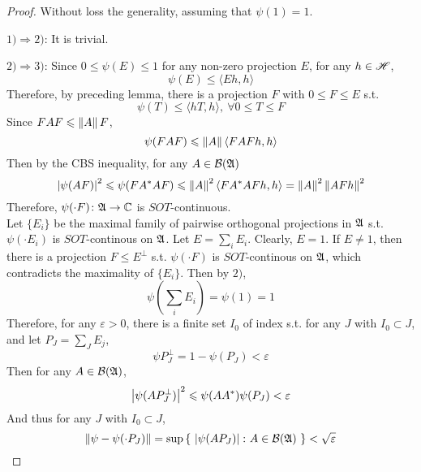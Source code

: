 \documentclass[a4paper,11pt]{report}
\begin{document}
\begin{proof}
	Without loss the generality, assuming that $\psi(1) = 1$.
	\item $1) \Rightarrow 2)$: It is trivial.
	\item $2) \Rightarrow 3)$: Since $0 \leqslant \psi(E) \leqslant 1$ for any non-zero projection $E$, for any $h \in \mathscr{H}$,
	\begin{equation*}
		\psi(E) \leqslant \langle Eh,h \rangle
	\end{equation*}
	Therefore, by preceding lemma, there is a projection $F$ with $0 \leqslant F \leqslant E$ s.t.
	\begin{equation*}
		\psi(T) \leqslant \langle hT,h \rangle,~ \forall 0 \leqslant  T \leqslant F
	\end{equation*}
	Since $FAF \leqslant \left\lVert A\right\lVert F$, 
	\begin{equation*}
		\psi(FAF) \leqslant \left\lVert A\right\lVert \langle FAFh,h \rangle
	\end{equation*}
	Then by the CBS inequality, for any $A \in \mathcal{B}(\mathfrak{A})$
	\begin{equation*}
		\left\lvert\psi(AF)\right\lvert^2 \leqslant \psi(FA^{*}AF) \leqslant \left\lVert A\right\lVert^2 \langle FA^{*}AFh,h \rangle = \left\lVert A\right\lVert^2 \left\lVert AFh\right\lVert^2
	\end{equation*}
	Therefore, $\psi(\cdot F) \colon \mathfrak{A} \rightarrow \mathbb{C}$ is $SOT$-continuous. \\
	Let $\{E_i\}$ be the maximal family of pairwise orthogonal projections in $\mathfrak{A}$ s.t. $\psi(\cdot E_i)$ is $SOT$-continous on $\mathfrak{A}$. Let $E = \sum_i E_i$. Clearly, $E = 1$. If $E \neq 1$, then there is a projection $F \leqslant E^{\bot}$ s.t. $\psi(\cdot F)$ is $SOT$-continous on $\mathfrak{A}$, which contradicts the maximality of $\{E_i\}$. Then by $2)$,
	\begin{equation*}
		\psi(\sum_i E_i) = \psi(1) = 1
	\end{equation*}  
	Therefore, for any $\varepsilon > 0$, there is a finite set $I_0$ of index s.t. for any $J$ with $I_0 \subset J$, and let $P_J = \sum_J E_j$,
	\begin{equation*}
		\psi{P_J^{\bot}} = 1- \psi(P_J) < \varepsilon
	\end{equation*}
	Then for any $A \in \mathcal{B}(\mathfrak{A})$, 
	\begin{equation*}
		\left\lvert\psi(AP_J^{\bot})\right\lvert^2  \leqslant \psi(AA^{*})\psi(P_J) < \varepsilon
	\end{equation*}
	And thus for any $J$ with $I_0 \subset J$,
	\begin{equation*}
		\norm{\psi - \psi(\cdot P_J)} = \sup{\{~\abs{\psi(AP_J)} \colon A \in \mathcal{B}(\A)~\}} < \sqrt{\varepsilon}

\end{equation*}
\end{proof}
\end{document}
